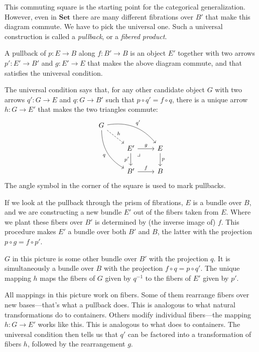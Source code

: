 \documentclass[DaoFP]{subfiles}
\begin{document}
This commuting square is the starting point for the categorical generalization. However, even in $\mathbf{Set}$ there are many different fibrations over $B'$ that make this diagram commute. We have to pick the universal one. Such a universal construction is called a \emph{pullback}, or a \emph{fibered product}.

A pullback of $p \colon E \to B$ along $f \colon B' \to B$ is an object $E'$ together with two arrows $p' \colon E' \to B'$ and $g \colon E' \to E$ that makes the above diagram commute, and that satisfies the universal condition. 

The universal condition says that, for any other candidate object $G$ with two arrows $q' \colon G \to E$ and $q \colon G \to B'$ such that $p \circ q' = f \circ q$, there is a unique arrow $h \colon G \to E'$ that makes the two triangles commute:
\[
 \begin{tikzcd}
 G
 \arrow[dr, dashed, "h"]
 \arrow[drr, bend left, "q'"]
 \arrow[ddr, bend right, "q"']
 \\
 &E'
 \arrow[r, "g"]
 \arrow[d, "p'"']
\arrow[dr, phantom,  , very near start, "\lrcorner"]
 &E
 \arrow[d, "p"]
 \\
 &B'
 \arrow[r, "f"]
 &B
  \end{tikzcd}
\]
The angle symbol in the corner of the square is used to mark pullbacks.

If we look at the pullback through the prism of fibrations, $E$ is a bundle over $B$, and we are constructing a new bundle $E'$ out of the fibers taken from $E$. Where we plant these fibers over $B'$ is determined by (the inverse image of) $f$. This procedure makes $E'$ a bundle over both $B'$ and $B$, the latter with the projection $p \circ g = f \circ p'$. 

$G$ in this picture is some other bundle over $B'$ with the projection $q$. It is simultaneously a bundle over $B$ with the projection $f \circ q = p \circ q'$. The unique mapping $h$ maps the fibers of $G$ given by $q^{-1}$ to the fibers of $E'$ given by $p'$. 

All mappings in this picture work on fibers. Some of them rearrange fibers over new bases---that's what a pullback does. This is analogous to what natural transformations do to containers. Others modify individual fibers---the mapping $h \colon G \to E'$ works like this. This is analogous to what  does to containers. The universal condition then tells us that $q'$ can be factored into a transformation of fibers $h$, followed by the rearrangement $g$.
\end{document}
